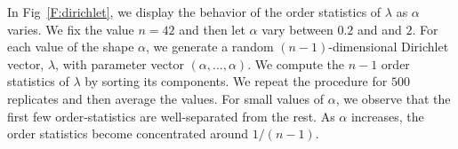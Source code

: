\documentclass[12pt]{article}
\theoremstyle{plain}
\begin{document}
In Fig~\ref{F:dirichlet}, we display the behavior of the order
statistics of $\lambda$ as $\alpha$ varies.  We fix the value $n = 42$
and then let $\alpha$ vary between $0.2$ and and $2$.  For each value
of the shape $\alpha$, we generate a random $(n-1)$-dimensional Dirichlet
vector, $\lambda$, with parameter vector $(\alpha, \dotsc, \alpha)$.
We compute the $n-1$ order statistics of $\lambda$ by sorting its
components.  We repeat the procedure for $500$ replicates and then
average the values.  For small values of $\alpha$, we observe that the
first few order-statistics are well-separated from the rest.  As
$\alpha$ increases, the order statistics become concentrated
around $1/(n-1)$.

\begin{figure}
    \centering
\end{figure}
\end{document}
